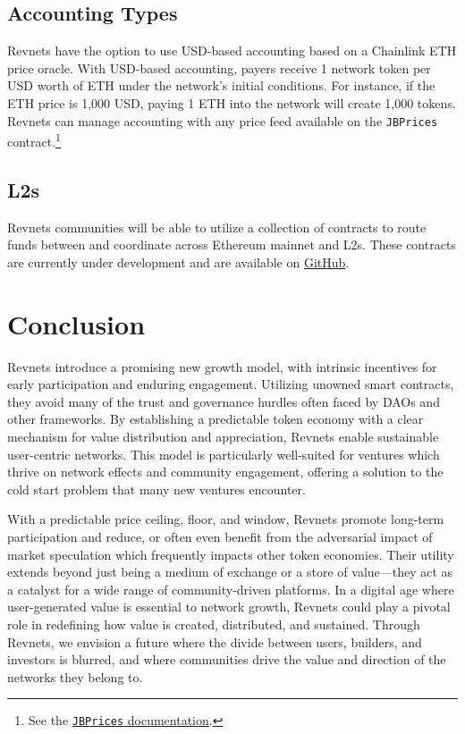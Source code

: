 \documentclass{article}
\begin{document}
\subsection{Accounting Types}\label{sec:accounting_types}

Revnets have the option to use USD-based accounting based on a Chainlink ETH price oracle. With USD-based accounting, payers receive 1 network token per USD worth of ETH under the network's initial conditions. For instance, if the ETH price is 1,000 USD, paying 1 ETH into the network will create 1,000 tokens. Revnets can manage accounting with any price feed available on the \texttt{JBPrices} contract.\footnote{See the \href{https://docs.juicebox.money/dev/api/contracts/jbprices/}{\texttt{JBPrices} documentation}.}

\subsection{L2s}

Revnets communities will be able to utilize a collection of contracts to route funds between and coordinate across Ethereum mainnet and L2s. These contracts are currently under development and are available on \href{https://github.com/Bananapus}{GitHub}.

\section{Conclusion}

Revnets introduce a promising new growth model, with intrinsic incentives for early participation and enduring engagement. Utilizing unowned smart contracts, they avoid many of the trust and governance hurdles often faced by DAOs and other frameworks. By establishing a predictable token economy with a clear mechanism for value distribution and appreciation, Revnets enable sustainable user-centric networks. This model is particularly well-suited for ventures which thrive on network effects and community engagement, offering a solution to the cold start problem that many new ventures encounter.

With a predictable price ceiling, floor, and window, Revnets promote long-term participation and reduce, or often even benefit from the adversarial impact of market speculation which frequently impacts other token economies. Their utility extends beyond just being a medium of exchange or a store of value---they act as a catalyst for a wide range of community-driven platforms. In a digital age where user-generated value is essential to network growth, Revnets could play a pivotal role in redefining how value is created, distributed, and sustained. Through Revnets, we envision a future where the divide between users, builders, and investors is blurred, and where communities drive the value and direction of the networks they belong to.
\end{document}
